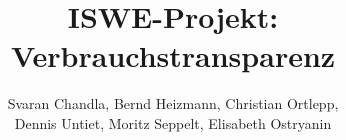 \documentclass{article}
\begin{document}
\title{ISWE-Projekt: Verbrauchstransparenz}
\author{Svaran Chandla, Bernd Heizmann, Christian Ortlepp,\\ Dennis Untiet, Moritz Seppelt, Elisabeth Ostryanin}
\maketitle
\tableofcontents
\newpage






\end{document}
